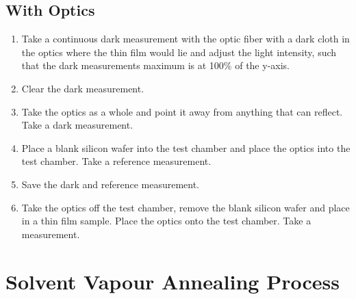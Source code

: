 \documentclass[MasterThesisMain.tex]{subfiles}
\begin{document}
\subsection{With Optics}
\begin{enumerate}
\item Take a continuous dark measurement with the optic fiber with a dark cloth in the optics where the thin film would lie and adjust the light intensity, such that the dark measurements maximum is at 100$\%$ of the y-axis.
\item Clear the dark measurement.
\item Take the optics as a whole and point it away from anything that can reflect. Take a dark measurement.
\item Place a blank silicon wafer into the test chamber and place the optics into the test chamber. Take a reference measurement.
\item Save the dark and reference measurement.
\item Take the optics off the test chamber, remove the blank silicon wafer and place in a thin film sample. Place the optics onto the test chamber. Take a measurement.
\end{enumerate}

\section{Solvent Vapour Annealing Process}
\end{document}
